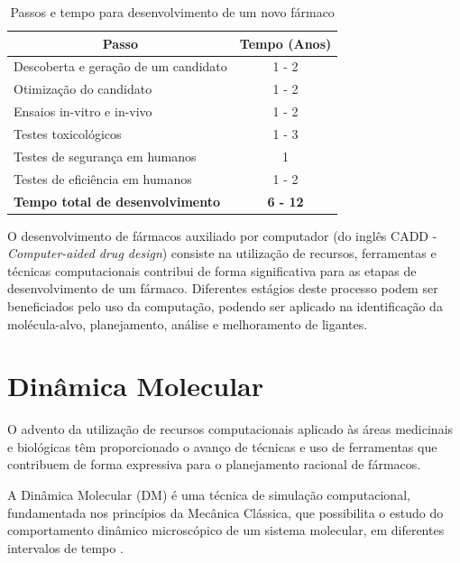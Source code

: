 \begin{table}[h]
	\caption{Passos e tempo para desenvolvimento de um novo fármaco \cite{kun92}}
	\label{tab:rddtempo}
	\centering
	\begin{tabular}{@{}lc@{}}
	\toprule
	\multicolumn{1}{c}{\textbf{Passo}}      & \textbf{Tempo (Anos)} \\ \midrule
	Descoberta e geração de um candidato    & 1 - 2                 \\
	Otimização do candidato                 & 1 - 2                 \\
	Ensaios in-vitro e in-vivo              & 1 - 2                 \\
	Testes toxicológicos                    & 1 - 3                 \\
	Testes de segurança em humanos          & 1                     \\
	Testes de eficiência em humanos         & 1 - 2                 \\ \midrule
	\textbf{Tempo total de desenvolvimento} & \textbf{6 - 12}       \\ \bottomrule
	\end{tabular}
\end{table}

O desenvolvimento de fármacos auxiliado por computador (do inglês CADD - \emph{Computer-aided drug design}) consiste na utilização de recursos, ferramentas e técnicas computacionais contribui de forma significativa para as etapas de desenvolvimento de um fármaco.  Diferentes estágios deste processo podem ser beneficiados pelo uso da computação, podendo ser aplicado na identificação da molécula-alvo, planejamento, análise e melhoramento de ligantes.


\section{Dinâmica Molecular}

O advento da utilização de recursos computacionais aplicado às áreas medicinais e biológicas têm proporcionado o avanço de técnicas e uso de ferramentas que contribuem de forma expressiva para o planejamento racional de fármacos.

A Dinâmica Molecular (DM) é uma técnica de simulação computacional, fundamentada nos princípios da Mecânica Clássica, que possibilita o estudo do comportamento dinâmico microscópico de um sistema molecular, em diferentes intervalos de tempo \cite{nam08}. 

